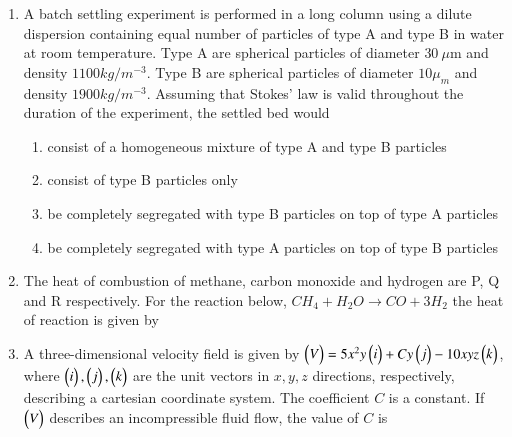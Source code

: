 \documentclass[journal,12pt,onecolumn]{IEEEtran}
\theoremstyle{remark}
\begin{document}
\begin{enumerate}
		\item A batch settling experiment is performed in a long column using a dilute dispersion containing equal number of particles of type A and type B in water  at room temperature. Type A are spherical particles of diameter $30~\mu\text{m}$ and density $1100kg/m^{-3}$. Type B are spherical particles of diameter $10\mu_{m}$ and density $1900kg/m^{-3}$. Assuming that Stokes' law is valid throughout the duration of the experiment, the settled bed would
		
		\hfill{}
		
		\begin{enumerate}
		\item consist of a homogeneous mixture of type A and type B particles
		\item consist of type B particles only
		\item be completely segregated with type B particles on top of type A particles
		\item be completely segregated with type A particles on top of type B particles
		\end{enumerate}
		
		\item The heat of combustion of methane, carbon monoxide and hydrogen are P, Q and R respectively. For the reaction below, $CH_{4}+H_{2}O\longrightarrow CO+3H_{2}$ the heat of reaction is given by
		
		\hfill{}
		
		\begin{enumerate}
		\end{enumerate}
		
		\item A three-dimensional velocity field is given by $\begin{pmatrix}V\end{pmatrix} = 5x^2y \begin{pmatrix}i\end{pmatrix} + Cy \begin{pmatrix}j\end{pmatrix} - 10xyz \begin{pmatrix}k\end{pmatrix}$, where $\begin{pmatrix}i\end{pmatrix}, \begin{pmatrix}j\end{pmatrix}, \begin{pmatrix}k\end{pmatrix}$ are the unit vectors in $x, y, z$ directions, respectively, describing a cartesian coordinate system. The coefficient $C$ is a constant. If $\begin{pmatrix}V\end{pmatrix}$ describes an incompressible fluid flow, the value of $C$ is
		
		\hfill{}
		

\end{enumerate}
\end{document}
